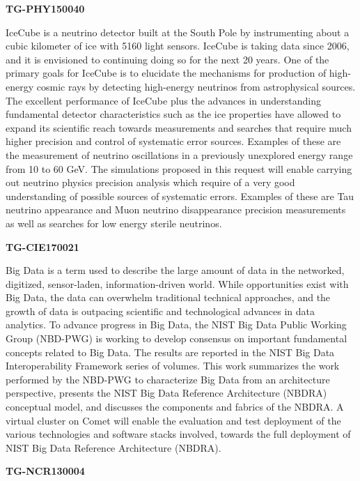 \textbf{TG-PHY150040}

IceCube is a neutrino detector built at the South Pole by instrumenting
about a cubic kilometer of ice with 5160 light sensors. IceCube is
taking data since 2006, and it is envisioned to continuing doing so for
the next 20 years. One of the primary goals for IceCube is to elucidate
the mechanisms for production of high-energy cosmic rays by detecting
high-energy neutrinos from astrophysical sources. The excellent
performance of IceCube plus the advances in understanding fundamental
detector characteristics such as the ice properties have allowed to
expand its scientific reach towards measurements and searches that
require much higher precision and control of systematic error sources.
Examples of these are the measurement of neutrino oscillations in a
previously unexplored energy range from 10 to 60 GeV. The simulations
proposed in this request will enable carrying out neutrino physics
precision analysis which require of a very good understanding of
possible sources of systematic errors. Examples of these are Tau
neutrino appearance and Muon neutrino disappearance precision
measurements as well as searches for low energy sterile neutrinos.

\textbf{TG-CIE170021}

Big Data is a term used to describe the large amount of data in the
networked, digitized, sensor-laden, information-driven world. While
opportunities exist with Big Data, the data can overwhelm traditional
technical approaches, and the growth of data is outpacing scientific and
technological advances in data analytics. To advance progress in Big
Data, the NIST Big Data Public Working Group (NBD-PWG) is working to
develop consensus on important fundamental concepts related to Big Data.
The results are reported in the NIST Big Data Interoperability Framework
series of volumes. This work summarizes the work performed by the
NBD-PWG to characterize Big Data from an architecture perspective,
presents the NIST Big Data Reference Architecture (NBDRA) conceptual
model, and discusses the components and fabrics of the NBDRA. A virtual
cluster on Comet will enable the evaluation and test deployment of the
various technologies and software stacks involved, towards the full
deployment of NIST Big Data Reference Architecture (NBDRA).

\textbf{TG-NCR130004}

